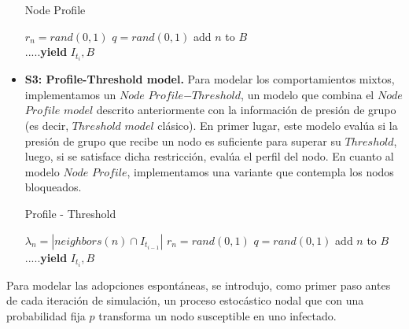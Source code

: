 \documentclass{article}
\begin{document}
\begin{itemize}
\begin{algorithm} 
	\caption{Node Profile}
	\begin{algorithmic}[1]	
		\State $r_n = rand(0,1)$
		\Else 
			\State $ q = rand(0,1)$
			\State add $n$ to $B$
			\EndIf
		\EndIf
		\EndIf
		\EndFor
	\\ \textbf{$.....$yield} $I_{t_i}, B$
	
	\EndFor
	\end{algorithmic}
\end{algorithm}

 \item \textbf{S3: Profile-Threshold model.}
Para modelar los comportamientos mixtos, implementamos un $Node$ $Profile$$-$$Threshold$, un modelo que combina el $Node$ $Profile$ $model$ descrito anteriormente con la información de presión de grupo (es decir, $Threshold$ $model$ clásico). En primer lugar, este modelo evalúa si la presión de grupo que recibe un nodo es suficiente para superar su $Threshold$, luego, si se satisface dicha restricción, evalúa el perfil del nodo. En cuanto al modelo $Node$ $Profile$, implementamos una variante que contempla los nodos bloqueados. 

\begin{algorithm} 
	\caption{Profile - Threshold}
	\begin{algorithmic}[1]	
		\State $\lambda_n = | neighbors(n)\cap I_{t_{i-1}}| $
		\State $r_n = rand(0,1)$
		\Else 
		\State $ q = rand(0,1)$
		\State add $n$ to $B$
		\EndIf
		\EndIf
		\EndIf
		\EndIf
		\EndFor
	\\ \textbf{$..... $yield} $I_{t_i}, B$
	\EndFor
	\end{algorithmic}
\end{algorithm}
\end{itemize}
Para modelar las adopciones espontáneas, se introdujo, como primer paso antes de cada iteración de simulación, un proceso estocástico nodal que con una probabilidad fija $p$ transforma un nodo susceptible en uno infectado.
\\
\end{document}
